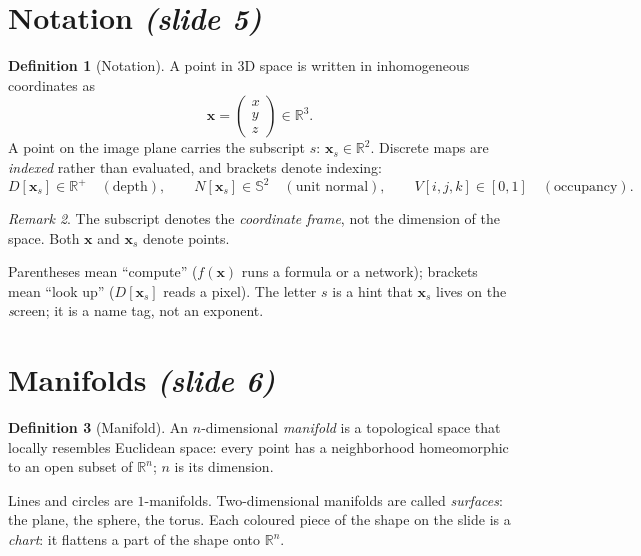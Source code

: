 \documentclass[11pt,a4paper]{article}
\newcommand{\R}{\mathbb{R}}
\newcommand{\Sph}{\mathbb{S}}
\newcommand{\vx}{\bm{x}}
\theoremstyle{definition}
\newtheorem{definition}{Definition}[section]
\theoremstyle{plain}
\theoremstyle{remark}
\newtheorem{remark}[definition]{Remark}
\newcommand{\slides}[1]{\texorpdfstring{\emph{(#1)}}{(#1)}}
\begin{document}
\section{Notation \slides{slide 5}}

\begin{definition}[Notation]
A point in 3D space is written in inhomogeneous coordinates as
\[
\vx=\begin{pmatrix}x\\y\\z\end{pmatrix}\in\R^3 .
\]
A point on the image plane carries the subscript $s$: $\vx_s\in\R^2$. Discrete maps are \emph{indexed} rather than evaluated, and brackets denote indexing:
\[
D[\vx_s]\in\R^+ \quad(\text{depth}),\qquad N[\vx_s]\in\Sph^2 \quad(\text{unit normal}),\qquad V[i,j,k]\in[0,1]\quad(\text{occupancy}).
\]
\end{definition}

\begin{remark}
The subscript denotes the \emph{coordinate frame}, not the dimension of the space. Both $\vx$ and $\vx_s$ denote points.
\end{remark}

\begin{intuition}
Parentheses mean ``compute'' ($f(\vx)$ runs a formula or a network); brackets mean ``look up'' ($D[\vx_s]$ reads a pixel). The letter $s$ is a hint that $\vx_s$ lives on the \emph{s}creen; it is a name tag, not an exponent.
\end{intuition}

\section{Manifolds \slides{slide 6}}

\begin{definition}[Manifold]
An $n$-dimensional \emph{manifold} is a topological space that locally resembles Euclidean space: every point has a neighborhood homeomorphic to an open subset of $\R^n$; $n$ is its dimension.
\end{definition}

Lines and circles are $1$-manifolds. Two-dimensional manifolds are called \emph{surfaces}: the plane, the sphere, the torus. Each coloured piece of the shape on the slide is a \emph{chart}: it flattens a part of the shape onto $\R^n$.
\end{document}
